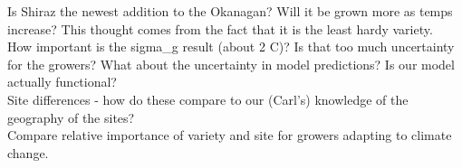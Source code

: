 \documentclass[11pt,letter]{article}
\begin{document}
Is Shiraz the newest addition to the Okanagan? Will it be grown more as temps increase? This thought comes from the fact that it is the least hardy variety. \\

How important is the sigma\_g result (about 2 \textdegree C)? Is that too much uncertainty for the growers? What about the uncertainty in model predictions? Is our model actually functional?\\


Site differences - how do these compare to our (Carl's) knowledge of the geography of the sites?\\


Compare relative importance of variety and site for growers adapting to climate change. \\






\end{document}
